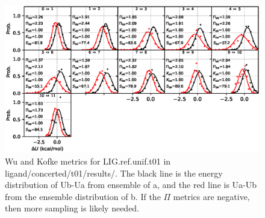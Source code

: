 \documentclass[journal=jctcce,manuscript=article,hyperref=false]{achemso}
\begin{document}
\begin{figure}
\includegraphics[clip,width=6in]{ligand.concerted.t01.results..hist.eps}\vspace{-0.3cm}
                        \caption{Wu and Kofke metrics for LIG.ref.unif.t01 in ligand/concerted/t01/results/. The black line is the energy distribution of Ub-Ua from ensemble of a, and the red line is Ua-Ub from the ensemble distribution of b. If the $\Pi$ metrics are negative, then more sampling is likely needed.}
\end{figure}
\end{document}
